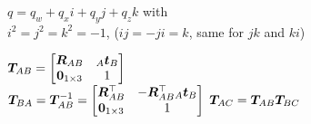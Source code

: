 \shortdefinition[Quaternions] $q = q_w + q_x i + q_y j + q_z k$ with\\
$i^2 = j^2 = k^2 = -1$, ($ij = -ji = k$, same for $jk$ and $ki$)

\shortdefinition[Transf. M] $\bm{T}_{AB} = \begin{bmatrix}
        \bm{R}_{AB}        & {_A}\bm{t}_B \\
        \bm{0}_{1\times 3} & 1
    \end{bmatrix}$\\
$\bm{T}_{BA} = \bm{T}_{AB}^{-1} =
    \begin{bmatrix}
        \bm{R}_{AB}^\top    & -\bm{R}_{AB}^\top {_A}\bm{t}_B \\
        \bm{0}_{1 \times 3} & 1
    \end{bmatrix}$
$\bm{T}_{AC} = \bm{T}_{AB} \bm{T}_{BC}$
